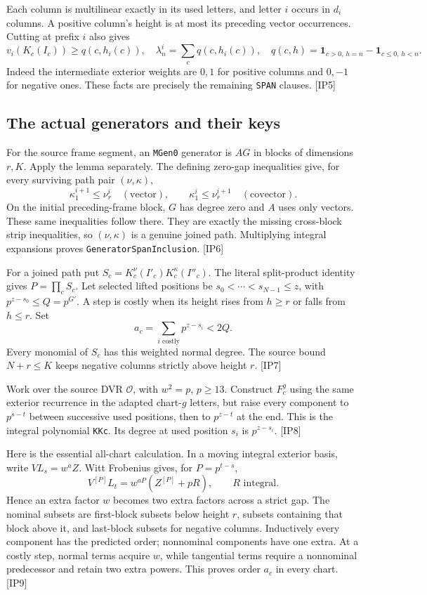 \documentclass[11pt,a4paper]{article}
\numberwithin{equation}{section}
\theoremstyle{remark}\newtheorem{remark}[theorem]{Remark}
\begin{document}
Each column is multilinear exactly in its used letters, and letter $i$ occurs in $d_i$ columns. A positive column's height is at most its preceding vector occurrences. Cutting at prefix $i$ also gives
\[
 v_i(K_c(I_c))\ge q(c,h_i(c)),\quad
 \lambda^i_n=\sum_cq(c,h_i(c)),\quad
 q(c,h)=\mathbf1_{c>0,\,h=n}-\mathbf1_{c\le0,\,h<n}.
 \tag{IP.3}
\]
Indeed the intermediate exterior weights are $0,1$ for positive columns and $0,-1$ for negative ones. These facts are precisely the remaining \texttt{SPAN} clauses. \textsf{[IP5]}

\subsection{The actual generators and their keys}

For the source frame segment, an \texttt{MGen0} generator is $AG$ in blocks of dimensions $r,K$. Apply the lemma separately. The defining zero-gap inequalities give, for every surviving path pair $(\nu,\kappa)$,
\[
 \kappa^{i+1}_1\le\nu^i_r\quad(\text{vector}),\qquad
 \kappa^i_1\le\nu^{i+1}_r\quad(\text{covector}).
\]
On the initial preceding-frame block, $G$ has degree zero and $A$ uses only vectors. These same inequalities follow there. They are exactly the missing cross-block strip inequalities, so $(\nu,\kappa)$ is a genuine joined path. Multiplying integral expansions proves \texttt{GeneratorSpanInclusion}. \textsf{[IP6]}

For a joined path put $S_c=K_c^{\nu}(I'_c)K_c^{\kappa}(I''_c)$. The literal split-product identity gives $P=\prod_cS_c$. Let selected lifted positions be $s_0<\cdots<s_{N-1}\le z$, with $p^{z-s_0}\le Q=p^{G'}$. A step is costly when its height rises from $h\ge r$ or falls from $h\le r$. Set
\[
 a_c=\sum_{i\text{ costly}}p^{z-s_i}<2Q.
 \tag{IP.4}
\]
Every monomial of $S_c$ has this weighted normal degree. The source bound $N+r\le K$ keeps negative columns strictly above height $r$. \textsf{[IP7]}

Work over the source DVR $\mathcal O$, with $w^2=p$, $p\ge13$. Construct $F_c^g$ using the same exterior recurrence in the adapted chart-$g$ letters, but raise every component to $p^{s-t}$ between successive used positions, then to $p^{z-t}$ at the end. This is the integral polynomial \texttt{KKc}. Its degree at used position $s_i$ is $p^{z-s_i}$. \textsf{[IP8]}

Here is the essential all-chart calculation. In a moving integral exterior basis, write $VL_s=w^aZ$. Witt Frobenius gives, for $P=p^{t-s}$,
\[
 V^{[P]}L_t=w^{aP}(Z^{[P]}+pR),\qquad R\text{ integral}.
 \tag{IP.5}
\]
Hence an extra factor $w$ becomes two extra factors across a strict gap. The nominal subsets are first-block subsets below height $r$, subsets containing that block above it, and last-block subsets for negative columns. Inductively every component has the predicted order; nonnominal components have one extra. At a costly step, normal terms acquire $w$, while tangential terms require a nonnominal predecessor and retain two extra powers. This proves order $a_c$ in every chart. \textsf{[IP9]}
\end{document}
